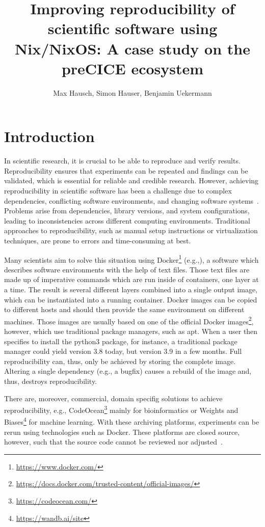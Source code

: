 \documentclass{eceasst}
\title{Improving reproducibility of scientific software using Nix/NixOS: A case study on the preCICE ecosystem}
\author{
Max Hausch\autref{1}\autref{*},
Simon Hauser\autref{1}\autref{*},
Benjamin Uekermann\autref{1}}
\institute{
\autlabel{1} Institute for Parallel and Distributed Systems\\ University of Stuttgart\\ \email{benjamin.uekermann@ipvs.uni-stuttgart.de}\\
\autlabel{*} These authors contributed equally to this work.}
\begin{document}
\maketitle

\section{Introduction}

In scientific research, it is crucial to be able to reproduce and verify results.
Reproducibility ensures that experiments can be repeated and findings can be validated, which is essential for reliable and credible research.
However, achieving reproducibility in scientific software has been a challenge due to complex dependencies, conflicting software environments, and changing software systems~\cite{Dalle_2012}.
Problems arise from dependencies, library versions, and system configurations, leading to inconsistencies across different computing environments.
Traditional approaches to reproducibility, such as manual setup instructions or virtualization techniques, are prone to errors and time-consuming at best.

Many scientists aim to solve this situation using Docker\footnote{\url{https://www.docker.com/}} (e.g.,\cite{koch2023sustainable}),
a software which describes software environments with the help of text files.
Those text files are made up of imperative commands which are run inside of containers, one layer at a time.
The result is several different layers combined into a single output image, which can be instantiated into a running container.
Docker images can be copied to different hosts and should then provide the same environment on different machines.
Those images are usually based on one of the official Docker images\footnote{\url{https://docs.docker.com/trusted-content/official-images/}}, however, which use traditional package managers, such as apt.
When a user then specifies to install the python3 package, for instance, a traditional package manager could yield version 3.8 today, but version 3.9 in a few months.
Full reproducibility can, thus, only be achieved by storing the complete image. Altering a single dependency (e.g., a bugfix) causes a rebuild of the image and, thus, destroys reproducibility.

There are, moreover, commercial, domain specifig solutions to achieve reproducibility, e.g., CodeOcean\footnote{\url{https://codeocean.com/}} mainly for bioinformatics or Weights and Biases\footnote{\url{https://wandb.ai/site}} for machine learning.
With these archiving platforms, experiments can be rerun using technologies such as Docker.
These platforms are closed source, however, such that the source code cannot be reviewed nor adjusted~\cite{koch2023sustainable}.
\end{document}
